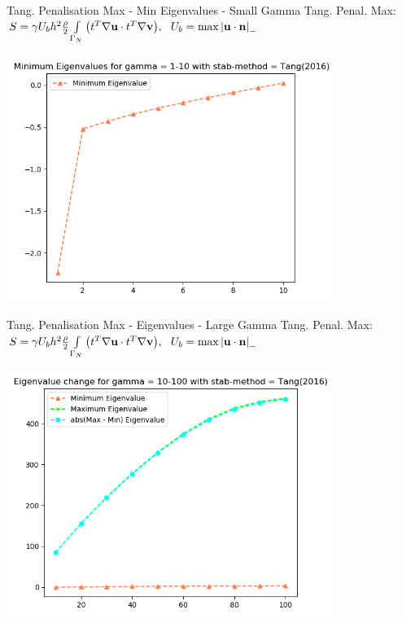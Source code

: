 \begin{frame}{Tang. Penalisation Max - Min Eigenvalues - Small Gamma}
Tang. Penal. Max: \(      S = \gamma U_b h^2 \frac{\rho}{2} \int\limits_{\Gamma_{N}} \qty(t^{T}\nabla{\textbf{u}} \cdot t^{T}\nabla{\textbf{v}}),  ~~U_b = \max \abs{{\textbf{u}} \cdot {\textbf{n}}}_-\)
    \begin{center}
        \includegraphics[width=0.8\textwidth]{Media/Gamma_1_thru_10_tang(2016)_min.png}
    \end{center}
\end{frame}

\begin{frame}{Tang. Penalisation Max - Eigenvalues - Large Gamma}
Tang. Penal. Max: \(      S = \gamma U_b h^2 \frac{\rho}{2} \int\limits_{\Gamma_{N}} \qty(t^{T}\nabla{\textbf{u}} \cdot t^{T}\nabla{\textbf{v}}),  ~~U_b = \max \abs{{\textbf{u}} \cdot {\textbf{n}}}_-\)
    \begin{center}
        \includegraphics[width=0.8\textwidth]{Media/Gamma_10_thru_100_tang(2016).png}
    \end{center}
\end{frame}

